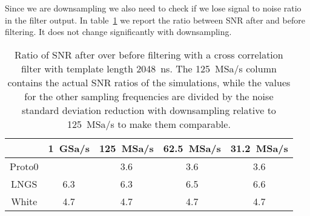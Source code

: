 Since we are downsampling we also need to check if we lose signal to noise
ratio in the filter output. In table~\ref{tab:filtsnrdowns} we report the
ratio between SNR after and before filtering. It does not change significantly
with downsampling.

\begin{table}
    \centering
    \begin{tabular}{c|cccc}
               & \SI{1}{GSa/s} & \SI{125}{MSa/s} & \SI{62.5}{MSa/s} & \SI{31.2}{MSa/s} \\ \hline
        Proto0 &               &             3.6 &              3.6 &              3.6 \\
          LNGS &           6.3 &             6.3 &              6.5 &              6.6 \\
         White &           4.7 &             4.7 &              4.7 &              4.7
    \end{tabular}
    
    \caption{Ratio of SNR after over before filtering with a cross correlation
    filter with template length \SI{2048}{ns}. The \SI{125}{MSa/s} column
    contains the actual SNR ratios of the simulations, while the values for the
    other sampling frequencies are divided by the noise standard deviation
    reduction with downsampling relative to \SI{125}{MSa/s} to make them
    comparable.}
    
    \label{tab:filtsnrdowns}
\end{table}
